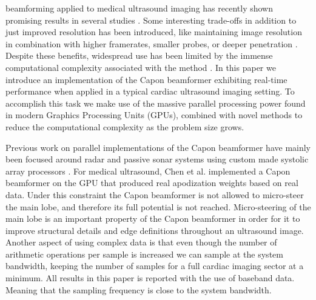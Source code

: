 \documentclass[12pt,journal,onecolumn]{IEEEtran}
\begin{document}
 beamforming \cite{Capon1969} applied to medical ultrasound imaging has recently shown promising results in several studies \cite{Synnevag2007, Austeng2008, Vignon2008, Viola, Mehdizadeh2012}. Some interesting trade-offs in addition to just improved resolution has been introduced, like maintaining image resolution in combination with higher framerates, smaller probes, or deeper penetration \cite{Synnevag2009}. Despite these benefits, widespread use has been limited by the immense computational complexity associated with the method \cite{So2011}. In this paper we introduce an implementation of the Capon beamformer exhibiting real-time performance when applied in a typical cardiac ultrasound imaging setting. To accomplish this task we make use of the massive parallel processing power found in modern Graphics Processing Units (GPUs), combined with novel methods to reduce the computational complexity as the problem size grows. 

Previous work on parallel implementations of the Capon beamformer have mainly been focused around radar and passive sonar systems using custom made systolic array processors \cite{McWhirter1989, Moonen1993, Sinha2002}. For medical ultrasound, Chen et al. \cite{Chen2011a, Chen2011} implemented a Capon beamformer on the GPU that produced real apodization weights based on real data. Under this constraint the Capon beamformer is not allowed to micro-steer the main lobe, and therefore its full potential is not reached. Micro-steering of the main lobe is an important property of the Capon beamformer in order for it to improve structural details and edge definitions throughout an ultrasound image. Another aspect of using complex data is that even though the number of arithmetic operations per sample is increased we can sample at the system bandwidth, keeping the number of samples for a full cardiac imaging sector at a minimum. All results in this paper is reported with the use of baseband data. Meaning that the sampling frequency is close to the system bandwidth. 

\end{document}

